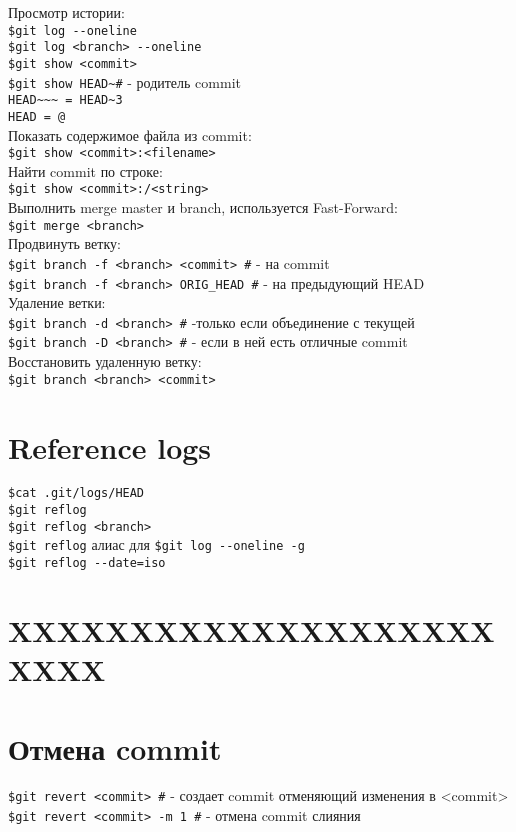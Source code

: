 \documentclass[12pt, a4paper]{article}
\begin{document}
\noindent Просмотр истории: \\
\indent \texttt{\$git log {-}-oneline} \\
\indent \texttt{\$git log <branch> {-}-oneline} \\
\indent \texttt{\$git show <commit>} \\
\indent \texttt{\$git show HEAD\~  \indent \#} - родитель commit \\
\indent \indent \texttt{HEAD\~{}\~{}\~{} = HEAD\~{}3}  \\
\indent \indent \texttt{HEAD = @}  \\

\noindent Показать содержимое файла из commit: \\
\indent \texttt{\$git show <commit>:<filename>} \\
\noindent Найти commit по строке: \\
\indent \texttt{\$git show <commit>:/<string>} \\

\noindent Выполнить merge master и branch, используется Fast-Forward: \\
\indent \texttt{\$git merge <branch>} \\

\noindent Продвинуть ветку: \\
\indent \texttt{\$git branch -f <branch> <commit> \indent \#} - на commit   \\
\indent \texttt{\$git branch -f <branch> ORIG\_HEAD \indent \#} - на предыдующий HEAD  \\

\noindent Удаление ветки: \\
\indent \texttt{\$git branch -d <branch> \indent \#} -только если объединение с текущей \\
\indent \texttt{\$git branch -D <branch> \indent \#} - если в ней есть отличные commit \\

\noindent Восстановить удаленную ветку: \\
\indent \texttt{\$git branch <branch> <commit>} \\


\section{Reference logs}

\texttt{\$cat .git/logs/HEAD} \\
\texttt{\$git reflog} \\
\texttt{\$git reflog <branch>} \\
\texttt{\$git reflog} \indent  алиас для \indent \texttt{\$git log {-}-oneline -g} \\
\texttt{\$git reflog {-}-date=iso} \\

\section{XXXXXXXXXXXXXXXXXXXXXXXX}



\section{Отмена commit}
\texttt{\$git revert <commit> \#} - создает commit отменяющий изменения в <commit> \\
\texttt{\$git revert <commit> -m 1 \indent \#}  - отмена commit слияния \\

	
\end{document}
